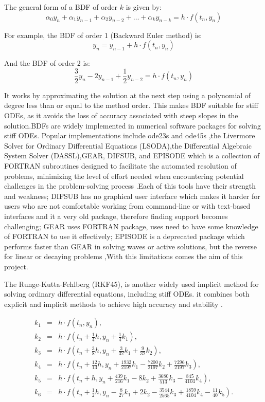 The general form of a BDF of order \(k\) is given by:
\[
\alpha_0 y_n + \alpha_1 y_{n-1} + \alpha_2 y_{n-2} + \ldots + \alpha_k y_{n-k} = h \cdot f(t_n, y_n)
\]

For example, the BDF of order 1 (Backward Euler method) is:
\[
y_n = y_{n-1} + h \cdot f(t_n, y_n)
\]

And the BDF of order 2 is:
\[
\frac{3}{2} y_n - 2y_{n-1} + \frac{1}{2} y_{n-2} = h \cdot f(t_n, y_n)
\]

It works by approximating the solution at the next step using a polynomial of degree less than or equal to the method order. This makes BDF suitable for stiff ODEs, as it avoids the loss of accuracy associated with steep slopes in the solution.BDFs are widely implemented in numerical software packages for solving stiff ODEs. Popular implementations include ode23s and ode45s \cite{shampine1997matlab},the Livermore Solver for Ordinary Differential Equations (LSODA),the Differential Algebraic System Solver (DASSL),GEAR, DIFSUB, and EPISODE \cite{Yatim2013} which is a collection of FORTRAN subroutines designed to facilitate the automated resolution of problems, minimizing the level of effort needed when encountering potential challenges in the problem-solving process \cite{thohura2013numerical}.Each of this tools have their strength and weakness; DIFSUB has no graphical user interface which makes it harder for users who are not comfortable working from command-line or with text-based interfaces and it a very old package, therefore finding support becomes challenging; GEAR uses FORTRAN package, uses need to have some knowledge of FORTRAN to use it effectively; EPISODE is a deprecated package which performs faster than GEAR in solving waves or active solutions, but the reverse for linear or decaying problems \cite{BYRNE1977125},With this limitations comes the aim of this project.

The Runge-Kutta-Fehlberg (RKF45), is another widely used implicit method for solving ordinary differential equations, including stiff ODEs. it combines both explicit and implicit methods to achieve high accuracy and stability \cite{stone2017accelerating}.

\begin{eqnarray*}
  k_1 & = & h \cdot f(t_n, y_n), \\
  k_2 & = & h \cdot f(t_n + \frac{1}{4}h, y_n + \frac{1}{4}k_1), \\
  k_3 & = & h \cdot f(t_n + \frac{3}{8}h, y_n + \frac{3}{32}k_1 + \frac{9}{32}k_2), \\
  k_4 & = & h \cdot f(t_n + \frac{12}{13}h, y_n + \frac{1932}{2197}k_1 - \frac{7200}{2197}k_2 + \frac{7296}{2197}k_3), \\
  k_5 & = & h \cdot f(t_n + h, y_n + \frac{439}{216}k_1 - 8k_2 + \frac{3680}{513}k_3 - \frac{845}{4104}k_4), \\
  k_6 & = & h \cdot f(t_n + \frac{1}{2}h, y_n - \frac{8}{27}k_1 + 2k_2 - \frac{3544}{2565}k_3 + \frac{1859}{4104}k_4 - \frac{11}{40}k_5).
  \end{eqnarray*}
  
